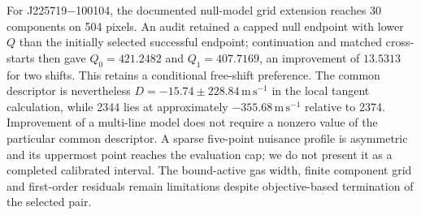 For J225719$-$100104, the documented null-model grid extension reaches 30 components on 504 pixels. An audit retained a capped null endpoint with lower $Q$ than the initially selected successful endpoint; continuation and matched cross-starts then gave $Q_0=421.2482$ and $Q_1=407.7169$, an improvement of $13.5313$ for two shifts. This retains a conditional free-shift preference. The common descriptor is nevertheless $D=-15.74\pm228.84\,\mathrm{m\,s^{-1}}$ in the local tangent calculation, while 2344 lies at approximately $-355.68\,\mathrm{m\,s^{-1}}$ relative to 2374. Improvement of a multi-line model does not require a nonzero value of the particular common descriptor. A sparse five-point nuisance profile is asymmetric and its uppermost point reaches the evaluation cap; we do not present it as a completed calibrated interval. The bound-active gas width, finite component grid and first-order residuals remain limitations despite objective-based termination of the selected pair.
